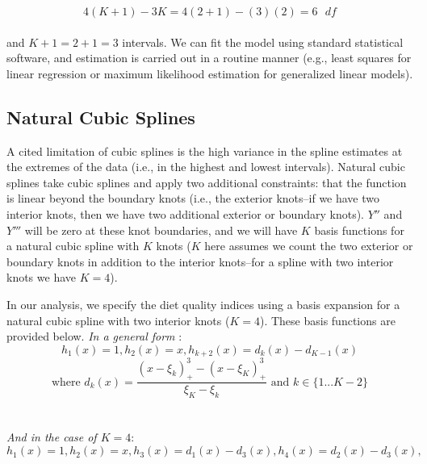 \documentclass{article}
\begin{document}
$$4(K+1)-3K=4(2+1)-(3)(2)=6\text{ }{df}$$
\\
\noindent and $K+1=2+1=3$ intervals. We can fit the model using standard statistical software, and estimation is carried out in a routine manner (e.g., least squares for linear regression or maximum likelihood estimation for generalized linear models).

\vspace{0.5cm} %
\subsection{Natural Cubic Splines}
\hspace{\parindent} A cited limitation of cubic splines is the high variance in the spline estimates at the extremes of the data (i.e., in the highest and lowest intervals). \supercite{hastie_elements_2009} Natural cubic splines take cubic splines and apply two additional constraints: that the function is linear beyond the boundary knots (i.e., the exterior knots--if we have two interior knots, then we have two additional exterior or boundary knots). $Y''$ and $Y'''$ will be zero at these knot boundaries, and we will have $K$ basis functions for a natural cubic spline with $K$ knots ($K$ here assumes we count the two exterior or boundary knots in addition to the interior knots--for a spline with two interior knots we have $K=4$). 

\hspace{\parindent} In our analysis, we specify the diet quality indices using a basis expansion for a natural cubic spline with two interior knots ($K=4$). These basis functions are provided below.
\newline
\newline
\textit{In a general form}\supercite{hastie_elements_2009} :
\\
$$h_1(x)=1,h_2(x)=x, h_{k+2}(x)=d_k(x)-d_{K-1}(x)$$
$$\text{where } d_k(x)=\frac{(x-\xi_k)^3_+-(x-\xi_K)^3_+}{\xi_K-\xi_k} \text{ and } k\in\{1...K-2\}$$
\\
\\
\textit{And in the case of $K=4$}:
$$h_1(x)=1,h_2(x)=x, h_{3}(x)=d_1(x)-d_{3}(x),h_{4}(x)=d_2(x)-d_{3}(x),$$
\\
\\
\end{document}
